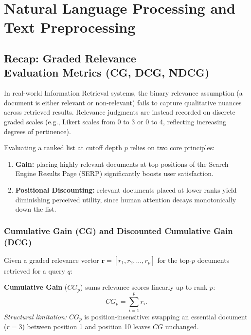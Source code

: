 \chapter{Natural Language Processing and Text Preprocessing}
\label{chap:nlp-preprocessing}
\label{chap:nlp-representation-en}

\FloatBarrier
\section[Recap: Graded Relevance Evaluation Metrics]{Recap: Graded Relevance\\ Evaluation Metrics (CG, DCG, NDCG)}
\label{sec:recap-graded-relevance}

In real-world Information Retrieval systems, the binary relevance assumption (a document is either relevant or non-relevant) fails to capture qualitative nuances across retrieved results. Relevance judgments are instead recorded on discrete graded scales (e.g., Likert scales from $0$ to $3$ or $0$ to $4$, reflecting increasing degrees of pertinence).

Evaluating a ranked list at cutoff depth $p$ relies on two core principles:
\begin{enumerate}
    \item \textbf{Gain:} placing highly relevant documents at top positions of the Search Engine Results Page (SERP) significantly boosts user satisfaction.
    \item \textbf{Positional Discounting:} relevant documents placed at lower ranks yield diminishing perceived utility, since human attention decays monotonically down the list.
\end{enumerate}

\subsection{Cumulative Gain (CG) and Discounted Cumulative Gain (DCG)}

Given a graded relevance vector $\mathbf{r} = [r_1, r_2, \dots, r_p]$ for the top-$p$ documents retrieved for a query $q$:

\begin{definition}
\textbf{Cumulative Gain} ($CG_p$) sums relevance scores linearly up to rank $p$:
\begin{equation}
CG_p = \sum_{i=1}^{p} r_i.
\end{equation}
\textit{Structural limitation:} $CG_p$ is position-insensitive: swapping an essential document ($r=3$) between position 1 and position 10 leaves $CG$ unchanged.
\end{definition}

